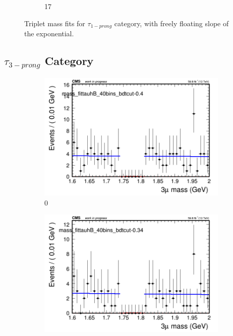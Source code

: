 \begin{figure}[h!]
\begin{subfigure}{0.2\textwidth}
        \caption{17}
    \end{subfigure}
    \caption{Triplet mass fits for $\tau_{1-prong}$ category, with freely floating slope of the exponential.}
    \label{fig:unfixed_tauha}
\end{figure}


\newpage

\subsection{$\tau_{3-prong}$ Category}
\label{sec:tauhb}

\begin{figure}[h!]
    \centering
    \begin{subfigure}{0.2\textwidth}
        \includegraphics[width=\textwidth]{power_law/plots/tauhB/massfit_tauhB_40bins_bdtcut-0.4.png}
        \caption{0}
    \end{subfigure}
    \begin{subfigure}{0.2\textwidth}
        \includegraphics[width=\textwidth]{power_law/plots/tauhB/massfit_tauhB_40bins_bdtcut-0.34.png}

\end{subfigure}
\end{figure}
